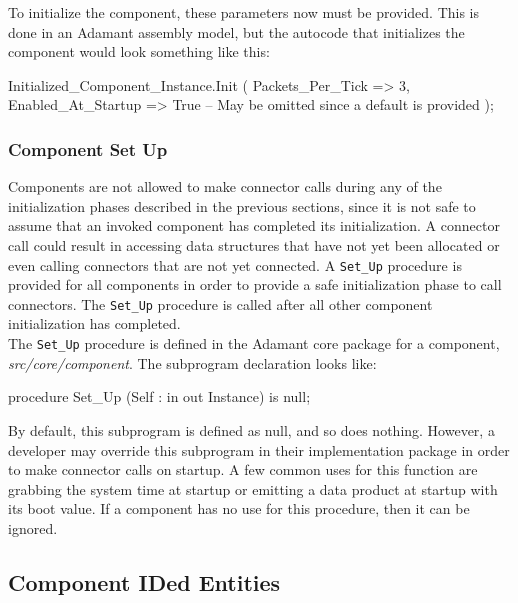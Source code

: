 To initialize the component, these parameters now must be provided. This is done in an Adamant assembly model, but the autocode that initializes the component would look something like this:

\vspace{5mm} %
\begin{adacode}
  Initialized_Component_Instance.Init (
    Packets_Per_Tick => 3,
    Enabled_At_Startup => True -- May be omitted since a default is provided
  );
\end{adacode}
\vspace{5mm} %

\subsubsection{Component Set Up} \label{Component Set Up}

Components are not allowed to make connector calls during any of the initialization phases described in the previous sections, since it is not safe to assume that an invoked component has completed its initialization. A connector call could result in accessing data structures that have not yet been allocated or even calling connectors that are not yet connected. A \texttt{Set\_Up} procedure is provided for all components in order to provide a safe initialization phase to call connectors. The \texttt{Set\_Up} procedure is called after all other component initialization has completed. \\

The \texttt{Set\_Up} procedure is defined in the Adamant core package for a component, \textit{src/core/component}. The subprogram declaration looks like:

\vspace{5mm} %
\begin{adacode}
procedure Set_Up (Self : in out Instance) is null;
\end{adacode}
\vspace{5mm} %

By default, this subprogram is defined as null, and so does nothing. However, a developer may override this subprogram in their implementation package in order to make connector calls on startup. A few common uses for this function are grabbing the system time at startup or emitting a data product at startup with its boot value. If a component has no use for this procedure, then it can be ignored.

\subsection{Component IDed Entities} \label{Component IDed Entities}

